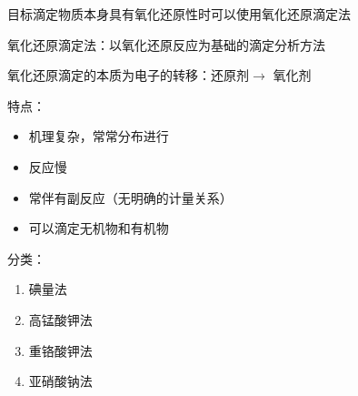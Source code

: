 目标滴定物质本身具有氧化还原性时可以使用氧化还原滴定法
\begin{defi}
氧化还原滴定法：以氧化还原反应为基础的滴定分析方法
\end{defi}
氧化还原滴定的本质为电子的转移：还原剂$\to $ 氧化剂

特点：
\begin{itemize}
    \item 机理复杂，常常分布进行
    \item 反应慢
    \item 常伴有副反应（无明确的计量关系）
    \item 可以滴定无机物和有机物
\end{itemize}
分类：
\begin{enumerate}
    \item 碘量法
    \item 高锰酸钾法
    \item 重铬酸钾法
    \item 亚硝酸钠法
\end{enumerate}
